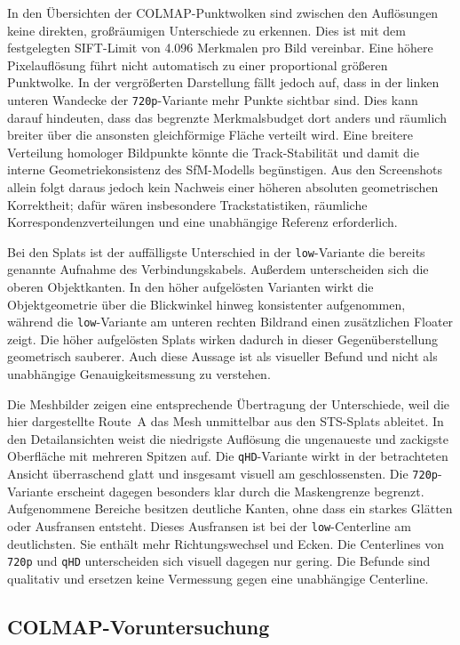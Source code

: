 In den Übersichten der COLMAP-Punktwolken sind zwischen den Auflösungen keine
direkten, großräumigen Unterschiede zu erkennen. Dies ist mit dem festgelegten
SIFT-Limit von 4.096 Merkmalen pro Bild vereinbar. Eine höhere Pixelauflösung
führt nicht automatisch zu einer proportional größeren Punktwolke. In der
vergrößerten Darstellung fällt jedoch auf, dass in der linken unteren
Wandecke der \texttt{720p}-Variante mehr Punkte sichtbar sind. Dies kann darauf
hindeuten, dass das begrenzte Merkmalsbudget dort anders und räumlich breiter
über die ansonsten gleichförmige Fläche verteilt wird. Eine breitere Verteilung
homologer Bildpunkte könnte die Track-Stabilität und damit die interne
Geometriekonsistenz des SfM-Modells begünstigen. Aus den Screenshots allein
folgt daraus jedoch kein Nachweis einer höheren absoluten geometrischen
Korrektheit; dafür wären insbesondere Trackstatistiken, räumliche
Korrespondenzverteilungen und eine unabhängige Referenz erforderlich.

Bei den Splats ist der auffälligste Unterschied in der \texttt{low}-Variante
die bereits genannte Aufnahme des Verbindungskabels. Außerdem unterscheiden
sich die oberen Objektkanten. In den höher aufgelösten Varianten wirkt die
Objektgeometrie über die Blickwinkel hinweg konsistenter aufgenommen, während
die \texttt{low}-Variante am unteren rechten Bildrand einen zusätzlichen
Floater zeigt. Die höher aufgelösten Splats wirken dadurch in dieser
Gegenüberstellung geometrisch sauberer. Auch diese Aussage ist als visueller
Befund und nicht als unabhängige Genauigkeitsmessung zu verstehen.

Die Meshbilder zeigen eine entsprechende Übertragung der Unterschiede, weil
die hier dargestellte Route~A das Mesh unmittelbar aus den STS-Splats ableitet.
In den Detailansichten weist die niedrigste Auflösung die ungenaueste und
zackigste Oberfläche mit mehreren Spitzen auf. Die \texttt{qHD}-Variante wirkt
in der betrachteten Ansicht überraschend glatt und insgesamt visuell am
geschlossensten. Die \texttt{720p}-Variante erscheint dagegen besonders klar
durch die Maskengrenze begrenzt. Aufgenommene Bereiche besitzen deutliche
Kanten, ohne dass ein starkes Glätten oder Ausfransen entsteht. Dieses
Ausfransen ist bei der \texttt{low}-Centerline am deutlichsten. Sie enthält
mehr Richtungswechsel und Ecken. Die Centerlines von \texttt{720p} und
\texttt{qHD} unterscheiden sich visuell dagegen nur gering. Die Befunde sind
qualitativ und ersetzen keine Vermessung gegen eine unabhängige Centerline.

\subsection{COLMAP-Voruntersuchung}

